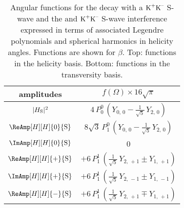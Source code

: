 \begin{table}[p]
  \centering
  \caption{Angular functions for the \BstoJpsiKK{} decay with a $\KK$ S-wave and the \BstoJpsiphi{} and $\KK$ S-wave interference
           expressed in terms of associated Legendre polynomials and spherical harmonics in helicity angles.
           Functions are shown for $\beta$\texteq{}.
           Top: functions in the helicity basis. Bottom: functions in the transversity basis.}
  \renewcommand{\arraystretch}{1.2}
  \label{tab:angDistSWavePY}
  \begin{tabular}{cc}
    \hline
    amplitudes                             &
      $f(\Omega) \times 16\sqrt{\pi}$      \\

    \hline\hline

    $\AmpSq[H]{{\text{S}}}$  &
      $4\, P_0^0\, (Y_{0,\,0} - \tfrac{1}{\sqrt{5}}\, Y_{2,\,0})$  \\
    \hline

    $\ReAmp[H][H]{0}{{\text{S}}}$  &
      $8\sqrt{3}\, P_1^0\, (Y_{0,\,0} - \tfrac{1}{\sqrt{5}}\, Y_{2,\,0})$  \\
    \hline

    $\ImAmp[H][H]{0}{{\text{S}}}$  &
      0  \\
    \hline

    $\ReAmp[H][H]{+}{{\text{S}}}$  &
      $+6\, P_1^1\, (\tfrac{1}{\sqrt{5}}\, Y_{2,\,+1} \pm Y_{1,\,+1})$  \\
    \hline

    $\ImAmp[H][H]{+}{{\text{S}}}$  &
      $+6\, P_1^1\, (\tfrac{1}{\sqrt{5}}\, Y_{2,\,-1} \pm Y_{1,\,-1})$  \\
    \hline

    $\ReAmp[H][H]{-}{{\text{S}}}$  &
      $+6\, P_1^1\, (\tfrac{1}{\sqrt{5}}\, Y_{2,\,+1} \mp Y_{1,\,+1})$  \\
    \hline


\end{tabular}
\end{table}
